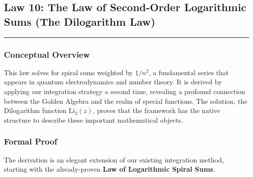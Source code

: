 \subsection*{Law 10: The Law of Second-Order Logarithmic Sums (The Dilogarithm Law)}
\hrule
\vspace{0.3cm}
\vspace{0.5cm}

\subsubsection*{Conceptual Overview}
This law solves for spiral sums weighted by $1/n^2$, a fundamental series that appears in quantum electrodynamics and number theory. It is derived by applying our integration strategy a second time, revealing a profound connection between the Golden Algebra and the realm of special functions. The solution, the Dilogarithm function $\text{Li}_2(z)$, proves that the framework has the native structure to describe these important mathematical objects.

\subsubsection*{Formal Proof}
The derivation is an elegant extension of our existing integration method, starting with the already-proven \textbf{Law of Logarithmic Spiral Sums}.

